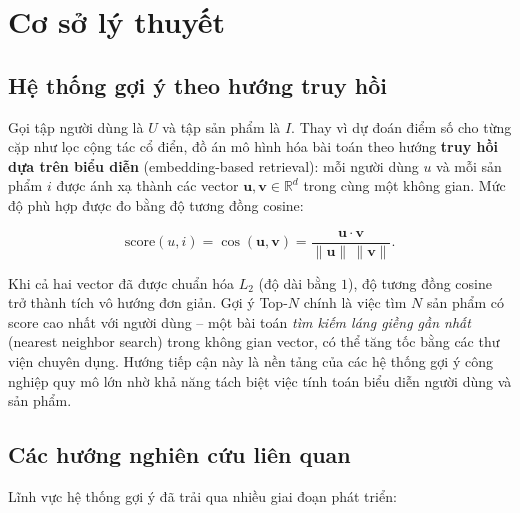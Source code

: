 \chapter{Cơ sở lý thuyết}
\label{chap:background}

\section{Hệ thống gợi ý theo hướng truy hồi}

Gọi tập người dùng là $U$ và tập sản phẩm là $I$. Thay vì dự đoán điểm số cho từng
cặp như lọc cộng tác cổ điển, đồ án mô hình hóa bài toán theo hướng \textbf{truy hồi
dựa trên biểu diễn} (embedding-based retrieval): mỗi người dùng $u$ và mỗi sản phẩm
$i$ được ánh xạ thành các vector $\mathbf{u}, \mathbf{v} \in \mathbb{R}^d$ trong cùng
một không gian. Mức độ phù hợp được đo bằng độ tương đồng cosine:

\begin{equation}
    \text{score}(u, i) = \cos(\mathbf{u}, \mathbf{v})
    = \frac{\mathbf{u} \cdot \mathbf{v}}{\|\mathbf{u}\|\,\|\mathbf{v}\|}.
\end{equation}

Khi cả hai vector đã được chuẩn hóa $L_2$ (độ dài bằng $1$), độ tương đồng cosine
trở thành tích vô hướng đơn giản. Gợi ý Top-$N$ chính là việc tìm $N$ sản phẩm có
score cao nhất với người dùng -- một bài toán \textit{tìm kiếm láng giềng gần nhất}
(nearest neighbor search) trong không gian vector, có thể tăng tốc bằng các thư viện
chuyên dụng. Hướng tiếp cận này là nền tảng của các hệ thống gợi ý công nghiệp quy
mô lớn nhờ khả năng tách biệt việc tính toán biểu diễn người dùng và sản phẩm.

\section{Các hướng nghiên cứu liên quan}

Lĩnh vực hệ thống gợi ý đã trải qua nhiều giai đoạn phát triển:

